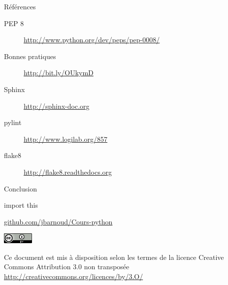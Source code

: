 \documentclass[xcolor=pdftex,dvipsnames,table,handout]{beamer}
\begin{document}
\begin{frame}{Références}
\begin{description}
    \item[PEP 8] \url{http://www.python.org/dev/peps/pep-0008/}
    \item[Bonnes pratiques] \url{http://bit.ly/OUkymD}
    \item[Sphinx] \url{http://sphinx-doc.org}
    \item[pylint] \url{http://www.logilab.org/857}
    \item[flake8] \url{http://flake8.readthedocs.org}
\end{description}
\end{frame}

\begin{frame}{Conclusion}
\begin{center}
    \Huge{import this}
\end{center}
\end{frame}

\begin{frame}[plain]
\vfill
\begin{center}
{\Large%
\url{github.com/jbarnoud/Cours-python}%
}
\vfill
\vfill
\vfill
{\tiny%
\includegraphics[width=1.5cm]{img/logo/cc_by}

Ce document est mis à disposition selon les termes de la licence Creative Commons Attribution 3.0 non transposée\newline
\url{http://creativecommons.org/licences/by/3.O/}
}
\end{center}
\end{frame}
\end{document}
